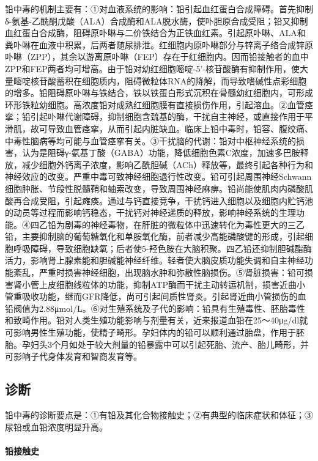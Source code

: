 铅中毒的机制主要有：①对血液系统的影响：铅引起血红蛋白合成障碍。首先抑制δ-氨基-乙酰酮戊酸（ALA）合成酶和ALA脱水酶，使卟胆原合成受阻；铅又抑制血红蛋白合成酶，阻碍原卟啉与二价铁结合为正铁血红素。引起原卟啉、ALA和粪卟啉在血液中积累，后两者随尿排泄。红细胞内原卟啉部分与锌离子络合成锌原卟啉（ZPP），其余以游离原卟啉（FEP）存在于红细胞内。因而铅接触者的血中ZPP和FEP两者均可增高。由于铅对幼红细胞嘧啶-5'{-}核苷酸酶有抑制作用，使大量嘧啶核苷酸蓄积在细胞质内，阻碍微粒体RNA的降解，而导致嗜碱性点彩细胞的增多。铅阻碍原卟啉与铁结合，铁以铁蛋白形式沉积在骨髓幼红细胞内，可形成环形铁粒幼细胞。高浓度铅对成熟红细胞膜有直接损伤作用，引起溶血。②血管痉挛；铅引起卟啉代谢障碍，抑制细胞含巯基的酶，干扰自主神经，或直接作用于平滑肌，故可导致血管痉挛，从而引起内脏缺血。临床上铅中毒时，铅容、腹绞痛、中毒性脑病等均可能与血管痉挛有关。③干扰脑的代谢：铅对中枢神经系统的损害，认为是阻碍γ-氨基丁酸（GABA）功能，降低细胞色素C浓度，加速多巴胺释放，减少细胞外钙离子浓度，影响乙酰胆碱（ACh）释放等，最终引起各种行为和神经效应的改变。严重中毒可致神经细胞退行性改变。铅可引起周围神经Schwann细胞肿胀、节段性脱髓鞘和轴索改变，导致周围神经麻痹。铅尚能使肌肉内磷酸肌酸再合成受阻，引起瘫痪。通过与钙直接竞争，干扰钙进入细胞以及细胞内贮钙池的动员等过程而影响钙稳态，干扰钙对神经递质的释放，影响神经系统的生理功能。④四乙铅为剧毒的神经毒物，在肝脏的微粒体中迅速转化为毒性更大的三乙铅，主要抑制脑的葡萄糖氧化和单胺氧化酶，前者减少高能磷酸键的形成，引起细胞呼吸障碍，导致细胞缺氧；后者使5-羟色胺在大脑积聚。四乙铅还抑制胆碱酯酶活力，影响肾上腺素能和胆碱能神经纤维。轻者使大脑皮质功能失调和自主神经功能紊乱，严重时损害神经细胞，出现脑水肿和弥散性脑损伤。⑤肾脏损害：铅可损害肾小管上皮细胞线粒体的功能，抑制ATP酶而干扰主动转运机制，损害近曲小管重吸收功能，继而GFR降低，尚可引起间质性肾炎。引起肾近曲小管损伤的血铅阀值为2.88μmol/L。⑥对生殖系统及子代的影响：铅具有生殖毒性、胚胎毒性和致畸作用。铅对人类生殖功能影响与剂量有关，近来报道血铅在25～40μg/dl就可影响男性生殖功能，使精子畸形。孕妇体内的铅可以顺利通过胎盘，作用于胚胎。孕妇头3个月如处于较大剂量的铅暴露中可以引起死胎、流产、胎儿畸形，并可影响子代身体发育和智商发育等。

\subsection{诊断}

铅中毒的诊断要点是：①有铅及其化合物接触史；②有典型的临床症状和体征；③尿铅或血铅浓度明显升高。

\paragraph{铅接触史}

